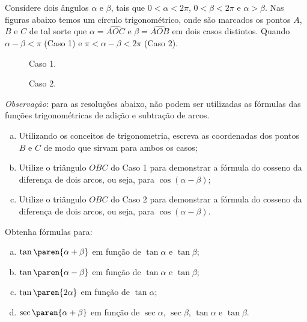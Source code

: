 \begin{exercise}
  Considere dois ângulos $\alpha$ e $\beta$, tais que $0 < \alpha < 2 \pi$, $0 < \beta < 2 \pi$ e $\alpha > \beta$. Nas figuras abaixo temos um círculo trigonométrico, onde são marcados os pontos $A$, $B$ e $C$ de tal sorte que $\alpha = \widehat{AOC}$ e $\beta = \widehat{AOB}$ em dois casos distintos. Quando $\alpha - \beta < \pi$ (Caso 1) e $\pi < \alpha - \beta < 2\pi$ (Caso 2). 
  \begin{figure}[H]
    \centering
    \caption{Caso 1.}
    \label{fig:cos-da-diferenca1}
  \end{figure}

  \begin{figure}[H]
    \centering
    \label{fig:cos-da-diferenca2}
    \caption{Caso 2.}
  \end{figure}

  \textit{Observação}: para as resoluções abaixo, não podem ser utilizadas as fórmulas das funções trigonométricas de adição e subtração de arcos.
  \begin{enumerate}[a)]
      \item Utilizando os conceitos de trigonometria, escreva as coordenadas dos pontos $B$ e $C$ de modo que sirvam para ambos os casos;
      \item Utilize o triângulo $OBC$ do Caso 1 para demonstrar a fórmula do cosseno da diferença de dois arcos, ou seja, para $\cos (\alpha - \beta)$;
      \item  Utilize o triângulo $OBC$ do Caso 2 para demonstrar a fórmula do cosseno da diferença de dois arcos, ou seja, para $\cos (\alpha - \beta)$.
\end{enumerate}
\end{exercise}

\begin{exercise}
    Obtenha fórmulas para: 
    \begin{enumerate}[a)]
      \item $\tan\paren{\alpha + \beta}$ em função de $\tan \alpha$ e $\tan \beta$;
      \item $\tan\paren{\alpha - \beta}$ em função de $\tan \alpha$ e $\tan \beta$;
      \item $\tan\paren{2 \alpha}$ em função de $\tan \alpha$;
      \item $\sec \paren{\alpha + \beta}$ em função de $\sec \alpha$, $\sec \beta$, $\tan \alpha$ e $\tan \beta$.
    \end{enumerate}
\end{exercise}

